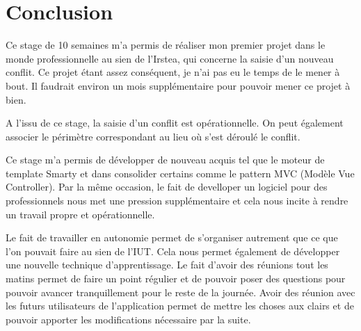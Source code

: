 \documentclass[12pt,a4paper,titlepage,twoside]{report}
\begin{document}
\cleardoublepage
\chapter{Conclusion}
Ce stage de 10 semaines m’a permis de réaliser mon premier projet dans le monde professionnelle au sien de l'Irstea, qui concerne la saisie d'un nouveau conflit. Ce projet étant assez conséquent, je n'ai pas eu le temps de le mener à bout. Il faudrait environ un mois supplémentaire pour pouvoir mener ce projet à bien. \newline\newline

A l’issu de ce stage, la saisie d'un conflit est opérationnelle. On peut également associer le périmètre correspondant au lieu où s'est déroulé le conflit. \newline\newline

Ce stage m'a permis de développer de nouveau acquis tel que le moteur de template Smarty et dans consolider certains comme le pattern MVC (Modèle Vue Controller). Par la même occasion, le fait de develloper un logiciel pour des professionnels nous met une pression supplémentaire et cela nous incite à rendre un travail propre et opérationnelle. \newline\newline

Le fait de travailler en autonomie permet de s'organiser autrement que ce que l'on pouvait faire au sien de l'IUT. Cela nous permet également de développer une nouvelle technique d'apprentissage. Le fait d'avoir des réunions tout les matins permet de faire un point régulier et de pouvoir poser des questions pour pouvoir avancer tranquillement pour le reste de la journée. \newline
Avoir des réunion avec les futurs utilisateurs de l'application permet de mettre les choses aux clairs et de pouvoir apporter les modifications nécessaire par la suite.
\end{document}
